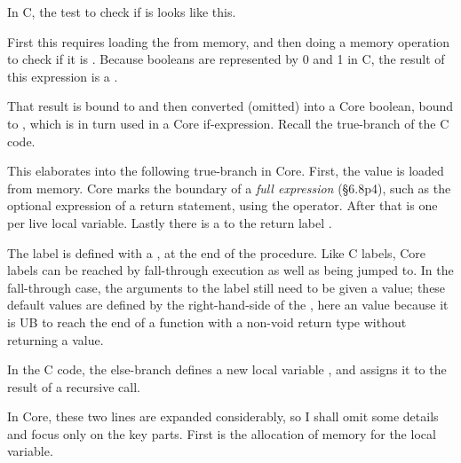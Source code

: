 

In C, the test to check if  is  looks like this.


First this requires loading the  from memory, and then doing a
 memory operation to check if it is .
Because booleans are represented by 0 and 1 in C, the result of this expression
is a .


That result is bound to  and then converted (omitted) into a
Core boolean, bound to , which is in turn used in a Core
if-expression. Recall the true-branch of the C code.


This elaborates into the following true-branch in Core. First, the value
 is loaded from memory. Core marks the boundary of a \emph{full
expression} (§6.8p4), such as the optional expression of a return statement,
using the  operator. After that is one %
 per live local variable. Lastly there is a %
 to the return label . %


The  label is defined with a , at the end
of the procedure. Like C labels, Core labels can be reached by fall-through
execution as well as being jumped to. In the fall-through case, the arguments
to the label still need to be given a value; these default values are defined
by the right-hand-side of the \coreinline{:=}, here an  %
value because it is UB to reach the end of a function with a non-void return
type without returning a value.


In the C code, the else-branch defines a new local variable ,
and assigns it to the result of a recursive call.


In Core, these two lines are expanded considerably, so I shall omit some
details and focus only on the key parts. First is the allocation of memory for
the local variable.

